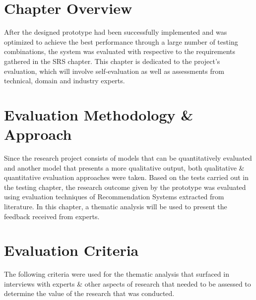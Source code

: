 
\section{Chapter Overview}
After the designed prototype had been successfully implemented and was optimized to achieve the best performance through a large number of testing combinations, the system was evaluated with respective to the requirements gathered in the SRS chapter. This chapter is dedicated to the project's evaluation, which will involve self-evaluation as well as assessments from technical, domain and industry experts.

\section{Evaluation Methodology \& Approach}
Since the research project consists of models that can be quantitatively evaluated and another model that presents a more qualitative output, both qualitative \& quantitative evaluation approaches were taken. Based on the tests carried out in the testing chapter, the research outcome given by the prototype was evaluated using evaluation techniques of Recommendation Systems extracted from literature. In this chapter, a thematic analysis will be used to present the feedback received from experts.

\section{Evaluation Criteria}

The following criteria were used for the thematic analysis that surfaced in interviews with experts \& other aspects of research that needed to be assessed to determine the value of the research that was conducted.

